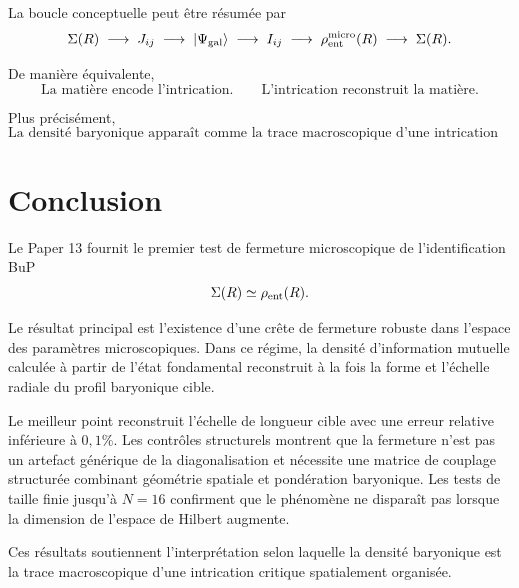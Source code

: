 \documentclass[11pt]{article}
\begin{document}
La boucle conceptuelle peut être résumée par
\[
\Sigma(R)
\;\longrightarrow\;
J_{ij}
\;\longrightarrow\;
|\Psi_{\rm gal}\rangle
\;\longrightarrow\;
I_{ij}
\;\longrightarrow\;
\rho_{\rm ent}^{\rm micro}(R)
\;\longrightarrow\;
\Sigma(R).
\]

De manière équivalente,
\[
\boxed{\text{La matière encode l'intrication.} \qquad \text{L'intrication reconstruit la matière.}}
\]

Plus précisément,
\[
\boxed{\text{La densité baryonique apparaît comme la trace macroscopique d'une intrication critique spatialement organisée.}}
\]

\section{Conclusion}

Le Paper 13 fournit le premier test de fermeture microscopique de l'identification BuP
\[
\Sigma(R) \simeq \rho_{\rm ent}(R).
\]

Le résultat principal est l'existence d'une crête de fermeture robuste dans l'espace des paramètres microscopiques. Dans ce régime, la densité d'information mutuelle calculée à partir de l'état fondamental reconstruit à la fois la forme et l'échelle radiale du profil baryonique cible.

Le meilleur point reconstruit l'échelle de longueur cible avec une erreur relative inférieure à \(0,1\%\). Les contrôles structurels montrent que la fermeture n'est pas un artefact générique de la diagonalisation et nécessite une matrice de couplage structurée combinant géométrie spatiale et pondération baryonique. Les tests de taille finie jusqu'à \(N = 16\) confirment que le phénomène ne disparaît pas lorsque la dimension de l'espace de Hilbert augmente.

Ces résultats soutiennent l'interprétation selon laquelle la densité baryonique est la trace macroscopique d'une intrication critique spatialement organisée.
\end{document}
